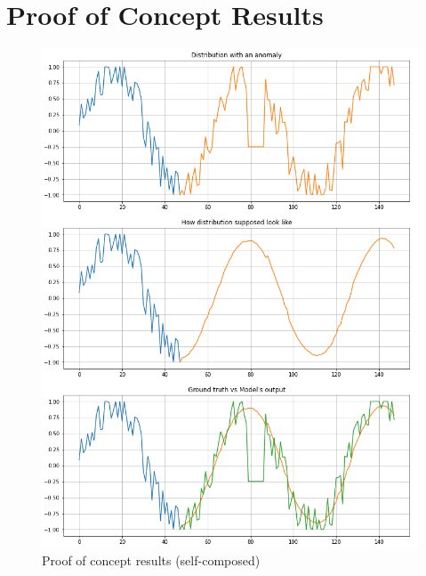 \chapter{Proof of Concept Results}\label{appendix:poc-results}

\begin{figure}[H]
    \includegraphics[width=14cm]{assets/appendix/poc-results.png}
    \caption{Proof of concept results (self-composed)}
\end{figure}